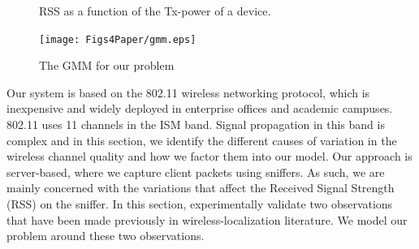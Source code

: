 \documentclass{Localization-PaperWriteupDraft}
\begin{document}
\begin{figure}
\begin{minipage}{0.3\textwidth}
\caption{RSS as a function of the Tx-power of a device.}
\label{fig:txpower}
\end{minipage}\quad%
\begin{minipage}{0.3\textwidth}%
\texttt{[image: Figs4Paper/gmm.eps]}
\caption{The GMM for our problem}
\label{fig:gmm}
\end{minipage}%
\end{figure}


% 






% 

Our system is based on the 802.11 wireless networking protocol, which is
inexpensive and widely deployed in enterprise offices and academic
campuses. 802.11 uses 11 channels in the ISM band. Signal
propagation in this band is complex and in this section, we identify the different
causes of variation in the wireless channel quality and how we factor
them into our model. Our approach is server-based, where we capture
client packets using sniffers. As such, we are mainly concerned with the
variations that affect the Received Signal Strength (RSS) on the
sniffer. In this section, experimentally validate two observations that have been made previously
in wireless-localization literature. We model our problem around these
two observations. 
\end{document}
